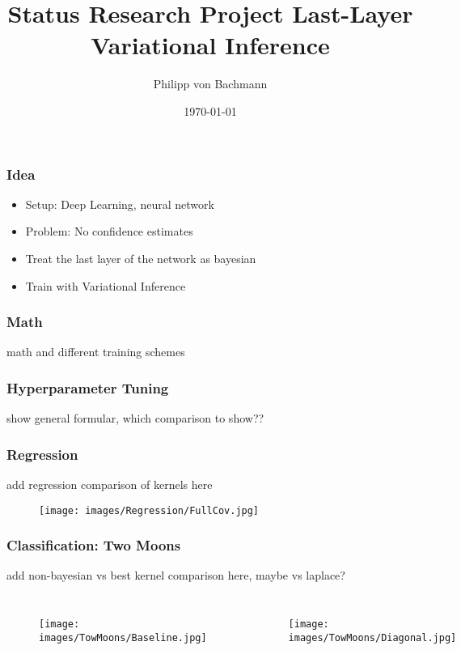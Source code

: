 \documentclass{beamer}
\title{Status Research Project Last-Layer Variational Inference}
\author{Philipp von Bachmann}
\institute{University of Tübingen}
\date{\today}
\begin{document}
        \begin{frame}
            \titlepage
        \end{frame}

        \begin{frame}
            \frametitle{Idea}
            \begin{itemize}
                \item Setup: Deep Learning, neural network
                \item Problem: No confidence estimates
                \item Treat the last layer of the network as bayesian
                \item Train with Variational Inference
            \end{itemize}
        \end{frame}

        \begin{frame}
            \frametitle{Math}
            math and different training schemes
        \end{frame}

        \begin{frame}
            \frametitle{Hyperparameter Tuning}
            show general formular, which comparison to show??
        \end{frame}

        \begin{frame}
            \frametitle{Regression}
            add regression comparison of kernels here
            \begin{figure}
                \texttt{[image: images/Regression/FullCov.jpg]}
            \end{figure}
        \end{frame}

        \begin{frame}
            \frametitle{Classification: Two Moons}
            add non-bayesian vs best kernel comparison here, maybe vs laplace?
            \begin{columns}
                \begin{figure}
                    \texttt{[image: images/TowMoons/Baseline.jpg]}
                \end{figure}
                \begin{figure}
                    \texttt{[image: images/TowMoons/Diagonal.jpg]}
                \end{figure}
            \end{columns}
        \end{frame}
\end{document}
